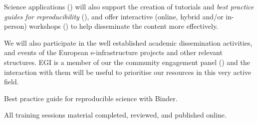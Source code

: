 \begin{workpackage}
\begin{wpdescription}

  Science applications () will also support the creation
   of tutorials and \emph{best practice guides for
    reproducibility} (), and
  offer interactive (online, hybrid and/or in-person) workshops () 
  to help disseminate the content more effectively.

  We will also participate in the well established academic dissemination
  activities, and events of the European e-infrastructure projects and other
  relevant structures. EGI is a member of our the community engagement panel
  () and the interaction with
  them will be useful to prioritise our resources in this very active field.
  
\end{wpdescription}

\begin{tasklist}



\end{tasklist}

\begin{wpdelivs}
  \begin{wpdeliv}[due=24,id=best-practice-guide,dissem=PU,nature=R,lead=IFR]
  {Best practice guide for reproducible science with Binder.}
\end{wpdeliv}
\begin{wpdeliv}[due=36,id=education-materials2,dissem=PU,nature=R,lead=IFR]
  {All training sessions material completed, reviewed, and published online.}
\end{wpdeliv}
\end{wpdelivs}

\end{workpackage}

